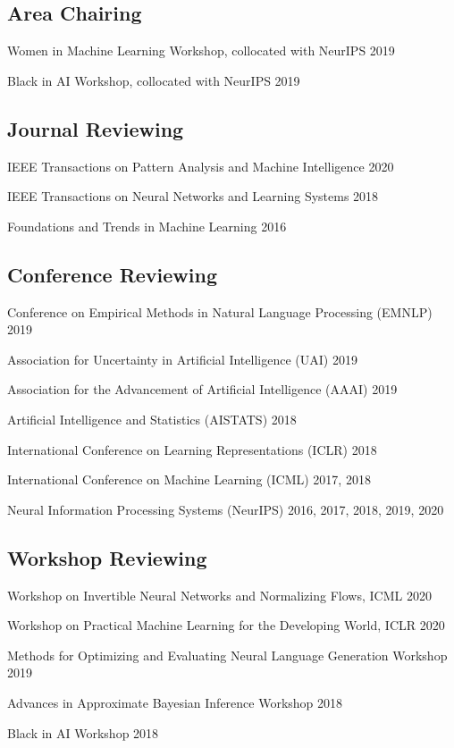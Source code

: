 \documentclass[letterpaper,200pt]{article}
\renewenvironment{itemize}{
  \begin{list}{}{
    \setlength{\leftmargin}{1.5em}
  }
}{
  \end{list}
}
\begin{document}
\subsection*{Area Chairing}
\begin{itemize}
	\item Women in Machine Learning Workshop, collocated with NeurIPS \hfill 2019
	\item Black in AI Workshop, collocated with NeurIPS \hfill 2019
\end{itemize}

\subsection*{Journal Reviewing}
\begin{itemize}
	\item IEEE Transactions on Pattern Analysis and Machine Intelligence \hfill 2020
	\item IEEE Transactions on Neural Networks and Learning Systems \hfill 2018
	\item Foundations and Trends in Machine Learning \hfill 2016
\end{itemize}

\subsection*{Conference Reviewing}
\begin{itemize}
	\item Conference on Empirical Methods in Natural Language Processing (EMNLP) \hfill 2019
	\item Association for Uncertainty in Artificial Intelligence (UAI) \hfill 2019
	\item Association for the Advancement of Artificial Intelligence (AAAI) \hfill 2019
	\item Artificial Intelligence and Statistics (AISTATS) \hfill 2018
	\item International Conference on Learning Representations (ICLR) \hfill 2018
	\item International Conference on Machine Learning (ICML) \hfill 2017, 2018
	\item Neural Information Processing Systems (NeurIPS) \hfill 2016, 2017, 2018, 2019, 2020
\end{itemize}

\subsection*{Workshop Reviewing}
\begin{itemize}
	\item Workshop on Invertible Neural Networks and Normalizing Flows, ICML \hfill 2020
	\item Workshop on Practical Machine Learning for the Developing World, ICLR  \hfill 2020
	\item Methods for Optimizing and Evaluating Neural Language Generation Workshop \hfill 2019
	\item Advances in Approximate Bayesian Inference Workshop  \hfill 2018
	\item Black in AI Workshop \hfill 2018
\end{itemize}
\end{document}
